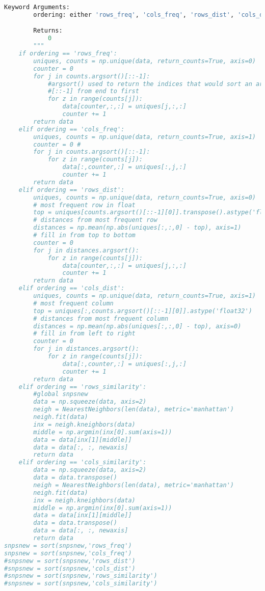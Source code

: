 \begin{lstlisting}[language=Python,breaklines]
    Keyword Arguments:
        ordering: either 'rows_freq', 'cols_freq', 'rows_dist', 'cols_dist'

        Returns:
            0
        """
    if ordering == 'rows_freq':
        uniques, counts = np.unique(data, return_counts=True, axis=0)
        counter = 0
        for j in counts.argsort()[::-1]:
            #argsort() used to return the indices that would sort an array.
            #[::-1] from end to first
            for z in range(counts[j]):
                data[counter,:,:] = uniques[j,:,:]
                counter += 1
        return data
    elif ordering == 'cols_freq':
        uniques, counts = np.unique(data, return_counts=True, axis=1)
        counter = 0 #
        for j in counts.argsort()[::-1]:
            for z in range(counts[j]):
                data[:,counter,:] = uniques[:,j,:]
                counter += 1
        return data
    elif ordering == 'rows_dist':
        uniques, counts = np.unique(data, return_counts=True, axis=0)
        # most frequent row in float
        top = uniques[counts.argsort()[::-1][0]].transpose().astype('float32')
        # distances from most frequent row
        distances = np.mean(np.abs(uniques[:,:,0] - top), axis=1)
        # fill in from top to bottom
        counter = 0
        for j in distances.argsort():
            for z in range(counts[j]):
                data[counter,:,:] = uniques[j,:,:]
                counter += 1
        return data
    elif ordering == 'cols_dist':
        uniques, counts = np.unique(data, return_counts=True, axis=1)
        # most frequent column
        top = uniques[:,counts.argsort()[::-1][0]].astype('float32')
        # distances from most frequent column
        distances = np.mean(np.abs(uniques[:,:,0] - top), axis=0)
        # fill in from left to right
        counter = 0
        for j in distances.argsort():
            for z in range(counts[j]):
                data[:,counter,:] = uniques[:,j,:]
                counter += 1
        return data
    elif ordering == 'rows_similarity':
        #global snpsnew
        data = np.squeeze(data, axis=2)
        neigh = NearestNeighbors(len(data), metric='manhattan')
        neigh.fit(data)
        inx = neigh.kneighbors(data)
        middle = np.argmin(inx[0].sum(axis=1))
        data = data[inx[1][middle]]
        data = data[:, :, newaxis]
        return data
    elif ordering == 'cols_similarity':
        data = np.squeeze(data, axis=2)
        data = data.transpose()
        neigh = NearestNeighbors(len(data), metric='manhattan')
        neigh.fit(data)
        inx = neigh.kneighbors(data)
        middle = np.argmin(inx[0].sum(axis=1))
        data = data[inx[1][middle]]
        data = data.transpose()
        data = data[:, :, newaxis]
        return data
snpsnew = sort(snpsnew,'rows_freq') 
snpsnew = sort(snpsnew,'cols_freq')
#snpsnew = sort(snpsnew,'rows_dist') 
#snpsnew = sort(snpsnew,'cols_dist')
#snpsnew = sort(snpsnew,'rows_similarity')
#snpsnew = sort(snpsnew,'cols_similarity')



\end{lstlisting}
